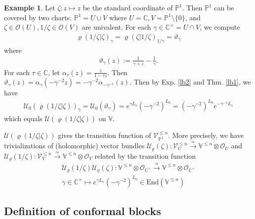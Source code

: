 \documentclass[11pt,b5paper,notitlepage]{article}
\theoremstyle{definition}
\newtheorem{eg}[df]{Example}
\theoremstyle{plain}
\newcommand{\mc}{\mathcal}
\newcommand{\End}{\mathrm{End}} %
\newcommand{\scr}{\mathscr}
\newcommand{\Vbb}{\mathbb V}
\newcommand{\Cbb}{\mathbb C}
\newcommand{\Pbb}{\mathbb P}
\numberwithin{equation}{section}
\begin{document}
\begin{eg}\label{lb3}
Let $\zeta:z\mapsto z$ be the standard coordinate of $\Pbb^1$. Then $\Pbb^1$ can be covered by two charts: $\Pbb^1=U\cup V$ where $U=\Cbb,V=\Pbb^1\setminus\{0\}$, and $\zeta\in\scr O(U),1/\zeta\in\scr O(V)$ are univalent. For each $\gamma\in\Cbb^\times=U\cap V$, we compute
\begin{align}
\varrho(1/\zeta|\zeta)_\gamma=\varrho(\zeta|1/\zeta)_{1/\gamma}=\vartheta_\gamma
\end{align}
where 
\begin{align}
\vartheta_\gamma(z):=\frac{1}{\gamma+z}-\frac 1\gamma.
\end{align}
For each $\tau\in\Cbb$, let $\alpha_\tau(z)=\frac{z}{1-\tau z}$. Then $\vartheta_\gamma(z)=\alpha_\gamma(-\gamma^{-2}z)=-\gamma^{-2}\alpha_{-\gamma^{-1}}(z)$. Then by Exp. \ref{lb2} and Thm. \ref{lb1}, we have 
\begin{align}
\mc U_0(\varrho(1/\zeta|\zeta))_\gamma=\mc U_0(\vartheta_\gamma)=e^{\gamma L_1}(-\gamma^{-2})^{L_0}=(-\gamma^{-2})^{L_0}e^{-\gamma^{-1}L_1}
\end{align}
which equals $\mc U(\varrho(1/\zeta|\zeta))$ on $\Vbb$.


$\mc U(\varrho(1/\zeta|\zeta))$ gives the transition function of $\scr V_{\Pbb^1}^{\leq n}$. More precisely, we have trivializations of (holomorphic) vector bundles $\mc U_\varrho(\zeta):\scr V_U^{\leq n}\xrightarrow{\simeq}\Vbb^{\leq n}\otimes\scr O_U$ and $\mc U_\varrho(1/\zeta):\scr V_V^{\leq n}\xrightarrow{\simeq}\Vbb^{\leq n}\otimes\scr O_V$ related by the transition function
\begin{gather*}
\mc U_\varrho(1/\zeta)\mc U_\varrho(\zeta):\Vbb^{\leq n}\otimes\scr O_{\Cbb^\times}\xrightarrow{\simeq}\Vbb^{\leq n}\otimes\scr O_{\Cbb^\times}\\
\gamma\in\Cbb^\times\mapsto e^{\gamma L_1}(-\gamma^{-2})^{L_0}\in\End(\Vbb^{\leq n})
\end{gather*}
\end{eg}


\subsection{Definition of conformal blocks}
\end{document}
